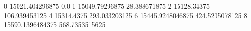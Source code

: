 0 15021.404296875 0.0
1 15049.79296875 28.388671875
2 15128.34375 106.939453125
4 15314.4375 293.033203125
6 15445.9248046875 424.5205078125
8 15590.1396484375 568.7353515625

